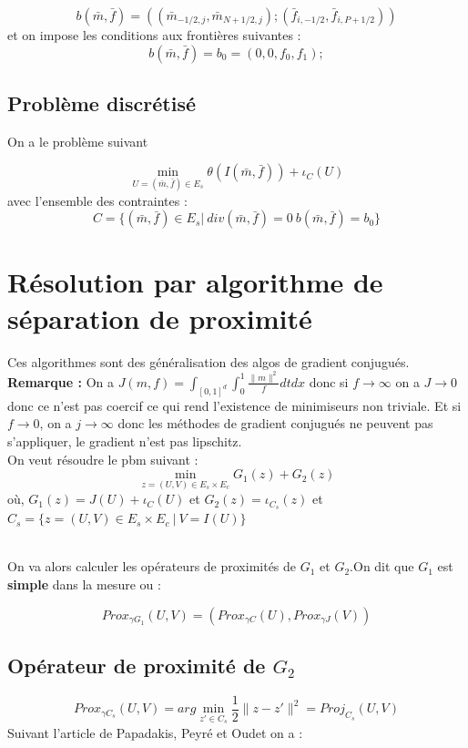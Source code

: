 \documentclass[a4paper,12pt]{article}
\begin{document}
$$
b(\bar{m},\bar{f}) = ((\bar{m}_{-1/2,j},\bar{m}_{N+1/2,j});(\bar{f}_{i,-1/2},\bar{f}_{i,P+1/2}))
$$
et on impose les conditions aux frontières suivantes : 
$$
b(\bar{m},\bar{f}) = b_0=(0,0,f_0,f_1);
$$

\subsection{Problème discrétisé}

On a le problème suivant 

$$
\min_{U=(\bar{m},\bar{f})\in E_s} \theta(I(\bar{m},\bar{f})) + \iota_C(U)
$$
avec l'ensemble des contraintes :
$$
C=\{(\bar{m},\bar{f})\in E_s|\ div(\bar{m},\bar{f}) = 0\ b(\bar{m},\bar{f}) = b_0 \}
$$

\section{Résolution par algorithme de séparation de proximité}
Ces algorithmes sont des généralisation des algos de gradient conjugués. \\

\textbf{Remarque : } On a $J(m,f)=\int_{[0,1]^d}\int_0^1 \frac{\|m\|^2}{f} dtdx$ donc si $f\rightarrow\infty$ on a $J\rightarrow 0$ donc ce n'est pas coercif ce qui rend l'existence de minimiseurs non triviale. Et si $f\rightarrow 0$, on a $j\rightarrow \infty$ donc les méthodes de gradient conjugués ne peuvent pas s'appliquer, le gradient n'est pas lipschitz. \\

On veut résoudre le pbm suivant : 
$$
\min_{z=(U,V)\in E_s\times E_c} G_1(z)+G_2(z)
$$
où, $G_1(z) = J(U)+\iota_C(U)$ et $G_2(z)=\iota_{C_s}(z)$ et $C_s=\{z=(U,V)\in E_s\times E_c\ | \ V=I(U) \}$


\\

On va alors calculer les opérateurs de proximités de $G_1$ et $G_2$.On dit que $G_1$ est \textbf{simple} dans la mesure ou : 

$$
Prox_{\gamma G_1} (U,V) = (Prox_{\gamma C} (U),Prox_{\gamma J} (V))
$$

\subsection{Opérateur de proximité de $G_2$}

$$
Prox_{\gamma C_s} (U,V) = arg\min_{z'\in C_s} \frac{1}{2}\|z-z'\|^2= Proj_{C_s}(U,V)
$$
Suivant l'article de Papadakis, Peyré et Oudet on a :
\end{document}
